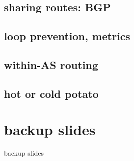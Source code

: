 \subsection{sharing routes: BGP}

\subsection{loop prevention, metrics}

\subsection{within-AS routing}

\subsection{hot or cold potato}

\section{backup slides}
\begin{frame}{backup slides}
\end{frame}


